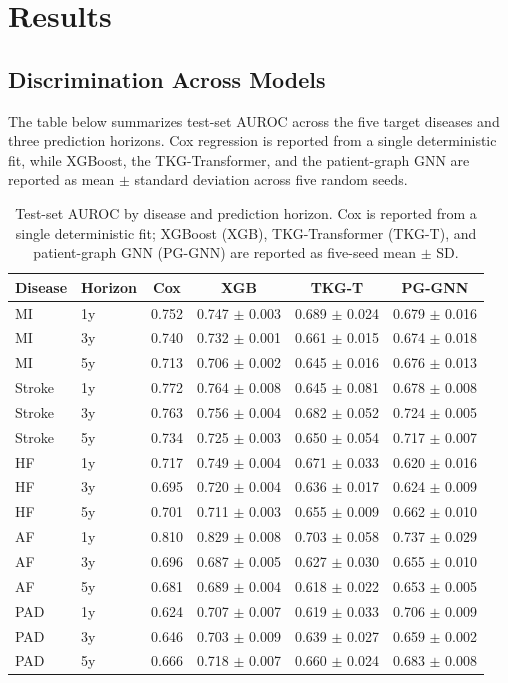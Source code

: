 \section{Results}

\subsection{Discrimination Across Models}
\label{sec:results-auroc}

The table below summarizes test-set AUROC across the five target diseases and three prediction horizons. Cox regression is reported from a single deterministic fit, while XGBoost, the TKG-Transformer, and the patient-graph GNN are reported as mean $\pm$ standard deviation across five random seeds.

\begin{table}[t]
\centering
\small
\caption{Test-set AUROC by disease and prediction horizon. Cox is reported from a single deterministic fit; XGBoost (XGB), TKG-Transformer (TKG-T), and patient-graph GNN (PG-GNN) are reported as five-seed mean $\pm$ SD.}
\label{tab:auroc}
\begin{tabular}{llcccc}
\hline
Disease & Horizon & Cox & XGB & TKG-T & PG-GNN \\
\hline
MI     & 1y & 0.752 & 0.747 $\pm$ 0.003 & 0.689 $\pm$ 0.024 & 0.679 $\pm$ 0.016 \\
MI     & 3y & 0.740 & 0.732 $\pm$ 0.001 & 0.661 $\pm$ 0.015 & 0.674 $\pm$ 0.018 \\
MI     & 5y & 0.713 & 0.706 $\pm$ 0.002 & 0.645 $\pm$ 0.016 & 0.676 $\pm$ 0.013 \\
Stroke & 1y & 0.772 & 0.764 $\pm$ 0.008 & 0.645 $\pm$ 0.081 & 0.678 $\pm$ 0.008 \\
Stroke & 3y & 0.763 & 0.756 $\pm$ 0.004 & 0.682 $\pm$ 0.052 & 0.724 $\pm$ 0.005 \\
Stroke & 5y & 0.734 & 0.725 $\pm$ 0.003 & 0.650 $\pm$ 0.054 & 0.717 $\pm$ 0.007 \\
HF     & 1y & 0.717 & 0.749 $\pm$ 0.004 & 0.671 $\pm$ 0.033 & 0.620 $\pm$ 0.016 \\
HF     & 3y & 0.695 & 0.720 $\pm$ 0.004 & 0.636 $\pm$ 0.017 & 0.624 $\pm$ 0.009 \\
HF     & 5y & 0.701 & 0.711 $\pm$ 0.003 & 0.655 $\pm$ 0.009 & 0.662 $\pm$ 0.010 \\
AF     & 1y & 0.810 & 0.829 $\pm$ 0.008 & 0.703 $\pm$ 0.058 & 0.737 $\pm$ 0.029 \\
AF     & 3y & 0.696 & 0.687 $\pm$ 0.005 & 0.627 $\pm$ 0.030 & 0.655 $\pm$ 0.010 \\
AF     & 5y & 0.681 & 0.689 $\pm$ 0.004 & 0.618 $\pm$ 0.022 & 0.653 $\pm$ 0.005 \\
PAD    & 1y & 0.624 & 0.707 $\pm$ 0.007 & 0.619 $\pm$ 0.033 & 0.706 $\pm$ 0.009 \\
PAD    & 3y & 0.646 & 0.703 $\pm$ 0.009 & 0.639 $\pm$ 0.027 & 0.659 $\pm$ 0.002 \\
PAD    & 5y & 0.666 & 0.718 $\pm$ 0.007 & 0.660 $\pm$ 0.024 & 0.683 $\pm$ 0.008 \\
\hline
\end{tabular}
\end{table}

